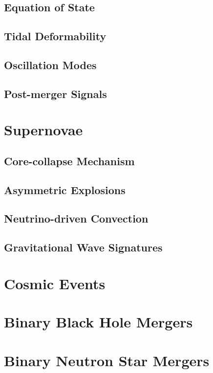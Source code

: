 \subsection{Equation of State}\label{subsec:equation-of-state}
\subsection{Tidal Deformability}\label{subsec:tidal-deformability}
\subsection{Oscillation Modes}\label{subsec:oscillation-modes}
\subsection{Post-merger Signals}\label{subsec:post-merger-signals}
\section{Supernovae}\label{sec:supernovae}
\subsection{Core-collapse Mechanism}\label{subsec:core-collapse-mechanism}
\subsection{Asymmetric Explosions}\label{subsec:asymmetric-explosions}
\subsection{Neutrino-driven Convection}\label{subsec:neutrino-driven-convection}
\subsection{Gravitational Wave Signatures}\label{subsec:gravitational-wave-signatures}
\section{Cosmic Events}\label{sec:cosmic-events}
\section{Binary Black Hole Mergers}\label{sec:binary-black-hole-mergers}
\section{Binary Neutron Star Mergers}\label{sec:binary-neutron-star-mergers}
